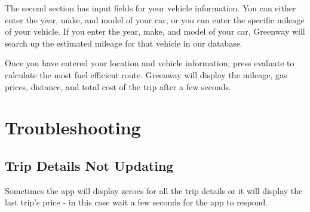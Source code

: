 \documentclass[12pt, titlepage]{article}
\begin{document}
The second section has input fields for your vehicle information. You can either enter the year, make, and model of your car, or you can enter the specific mileage of your vehicle. If you enter the year, make, and model of your car, Greenway will search up the estimated mileage for that vehicle in our database. 

\begin{center}
\end{center}

Once you have entered your location and vehicle information, press evaluate to calculate the most fuel efficient route. Greenway will display the mileage, gas prices, distance, and total cost of the trip after a few seconds. 

\begin{center}
\end{center}

\section{Troubleshooting}
\subsection{Trip Details Not Updating}
Sometimes the app will display zeroes for all the trip details or it will display the last trip's price - in this case wait a few seconds for the app to respond.
\end{document}
